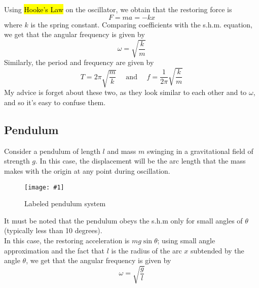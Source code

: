 \documentclass[a4paper,12pt]{article}
\newcommand{\lb}{\\[8pt]}
\newcommand{\img}[4]{\begin{center}
  \begin{figure}[H]
    \centering
    \texttt{[image: \#1]}
    \caption{#3}
    \label{fig:#4}
  \end{figure}
\end{center}}
\begin{document}
Using \hl{Hooke's Law} on the oscillator, we obtain that the restoring force is
$$F = ma = -kx$$
where $k$ is the spring constant. Comparing coefficients with the s.h.m. equation, we get that the angular frequency is given by
$$\omega = \sqrt{\frac{k}{m}}$$
Similarly, the period and frequency are given by
$$T = 2\pi\sqrt{\frac{m}{k}}\quad\text{ and }\quad f = \frac{1}{2\pi}\sqrt{\frac{k}{m}}$$
My advice is forget about these two, as they look similar to each other and to $\omega$, and so it's easy to confuse them.

\pagebreak

\subsection{Pendulum}

Consider a pendulum of length $l$ and mass $m$ swinging in a gravitational field of strength $g$. In this case, the displacement will be the arc length that the mass makes with the origin at any point during oscillation.
\img{pendulumlabeled.png}{0.6}{Labeled pendulum system}{pendulumlabeled}
It must be noted that the pendulum obeys the s.h.m only for small angles of $\theta$ (typically less than 10 degrees).\lb
In this case, the restoring acceleration is $mg\sin\theta$; using small angle approximation and the fact that $l$ is the radius of the arc $x$ subtended by the angle $\theta$, we get that the angular frequency is given by
\begin{equation}
  \omega = \sqrt{\frac{g}{l}}
\end{equation}
\end{document}
